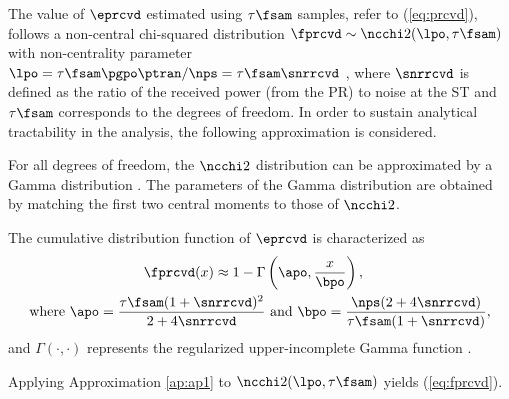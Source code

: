 The value of $\eprcvd$ estimated using $\tau \fsam$ samples, refer to (\ref{eq:prcvd}), follows a non-central chi-squared distribution $\fprcvd \sim \ncchi2(\lpo, \tau \fsam)$ with non-centrality parameter $\lpo = \tau \fsam \pgpo \ptran /\nps = \tau \fsam \snrrcvd$ \cite{Kay}, where $\snrrcvd$ is defined as the ratio of the received power (from the PR) to noise at the ST and $\tau \fsam$ corresponds to the degrees of freedom. In order to sustain analytical tractability in the analysis, the following approximation is considered. 
\begin{approxi} \label{ap:ap1}
\normalfont
For all degrees of freedom, the $\ncchi2$ distribution can be approximated by a Gamma distribution \cite{abramo}. The parameters of the Gamma distribution are obtained by matching the first two central moments to those of $\ncchi2$.
\end{approxi}
\begin{lemma} \label{lm:lm1}
\normalfont
The cumulative distribution function of $\eprcvd$ is characterized as 
\begin{align}
\fprcvd(x) \approx 1 - \Gamma&\left(\apo, \frac{x}{\bpo}\right) \label{eq:fprcvd}, \\ 
\text{where  } \apo = \frac{\tau \fsam (1 + \snrrcvd)^2}{2 + 4 \snrrcvd} &\text{ and } \bpo = \frac{\nps (2 + 4 \snrrcvd)}{\tau \fsam (1 + \snrrcvd)},  \label{eq:para_po} 
\end{align} 
and $\Gamma(\cdot, \cdot)$ represents the regularized upper-incomplete Gamma function \cite{abramo}. 
\end{lemma}
\begin{IEEEproof}
Applying Approximation \ref{ap:ap1} to $\ncchi2(\lpo, \tau \fsam)$ yields (\ref{eq:fprcvd}). 
\end{IEEEproof}

